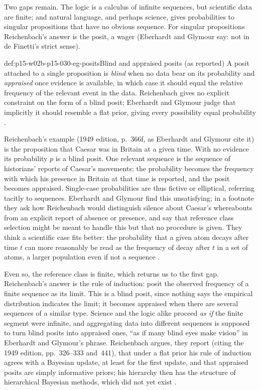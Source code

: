 Two gaps remain. The logic is a calculus of infinite sequences, but
scientific data are finite; and natural language, and perhaps science,
gives probabilities to singular propositions that have no obvious
sequence. For singular propositions Reichenbach's answer is the posit, a
wager (Eberhardt and Glymour say: not in de Finetti's strict sense).

\begin{hbdefinition}{def:p15-w02b-p15-030-eg-posits}{Blind and appraised posits (as reported)}
A posit attached to a single proposition is \emph{blind} when no data
bear on its probability and \emph{appraised} once evidence is available,
in which case it should equal the relative frequency of the relevant
event in the data. Reichenbach gives no explicit constraint on the form
of a blind posit; Eberhardt and Glymour judge that implicitly it should resemble a
flat prior, giving every possibility equal probability
\cite[p.~373]{EberhardtGlymour2011ReichenbachReading}.
\end{hbdefinition}

Reichenbach's example (1949 edition, p.~366f, as Eberhardt and Glymour cite it) is
the proposition that Caesar was in Britain at a given time. With no
evidence its probability \(p\) is a blind posit. One relevant sequence is
the sequence of historians' reports of Caesar's movements; the
probability becomes the frequency with which his presence in Britain at
that time is reported, and the posit becomes appraised. Single-case
probabilities are thus fictive or elliptical, referring tacitly to
sequences. Eberhardt and Glymour find this unsatisfying; in a footnote they ask
how Reichenbach would distinguish silence about Caesar's whereabouts
from an explicit report of absence or presence, and say that reference
class selection might be meant to handle this but that no procedure is
given. They think a scientific case fits better: the probability that a
given atom decays after time \(t\) can more reasonably be read as the
frequency of decay after \(t\) in a set of atoms, a larger population
even if not a sequence \cite[pp.~373--374 and n.~9]{EberhardtGlymour2011ReichenbachReading}.

Even so, the reference class is finite, which returns us to the first
gap. Reichenbach's answer is the rule of induction: posit the observed
frequency of a finite sequence as its limit. This is a blind posit, since
nothing says the empirical distribution indicates the limit; it becomes
appraised when there are several sequences of a similar type. Science
and the logic alike proceed \emph{as if} the finite segment were
infinite, and aggregating data into different sequences is supposed to
turn blind posits into appraised ones, ``as if many blind eyes make
vision'' in Eberhardt and Glymour's phrase. Reichenbach argues, they report (citing
the 1949 edition, pp.~326--333 and~441), that under a flat prior his rule
of induction agrees with a Bayesian update, at least for the first
update, and that appraised posits are simply informative priors; his
hierarchy then has the structure of hierarchical Bayesian methods, which
did not yet exist \cite[p.~374 and n.~10]{EberhardtGlymour2011ReichenbachReading}.

